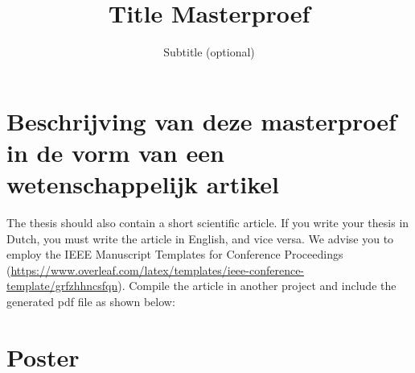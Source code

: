 \documentclass[11pt,a4paper]{report}
\title{Title Masterproef}
\subtitle{Subtitle (optional)}
\begin{document}
\preface%

\printnoidxglossary[type=\acronymtype]%
\clearpage


%
%
%

\printbibliography


\appendix


\chapter{Beschrijving van deze masterproef in de vorm van een wetenschappelijk artikel}
The thesis should also contain a short scientific article. If you write your thesis in Dutch, you must write the article in English, and vice versa. We advise you to employ the IEEE Manuscript Templates for Conference Proceedings (\url{https://www.overleaf.com/latex/templates/ieee-conference-template/grfzhhncsfqn}).
Compile the article in another project and include the generated pdf file as shown below:



\chapter{Poster}
%
\end{document}
